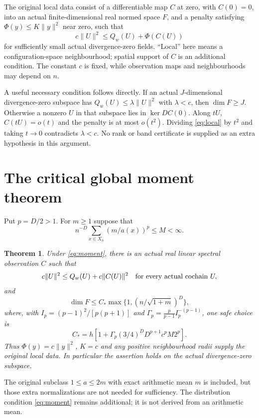 \documentclass[11pt]{article}
\newtheorem{theorem}{Theorem}
\begin{document}
The original local data consist of a differentiable map $C$ at zero, with $C(0)=0$,
into an actual finite-dimensional real normed space $F$, and a penalty satisfying
$\Phi(y)\leq K\|y\|^2$ near zero, such that
\begin{equation}\label{eq:local}
 c\|U\|^2\leq Q_w(U)+\Phi(C(U))
\end{equation}
for sufficiently small actual divergence-zero fields. ``Local'' here means a
configuration-space neighbourhood; spatial support of $C$ is an additional condition.
The constant $c$ is fixed, while observation maps and neighbourhoods may depend on $n$.

A useful necessary condition follows directly. If an actual $J$-dimensional
divergence-zero subspace has $Q_w(U)\leq\lambda\|U\|^2$ with $\lambda<c$, then
$\dim F\geq J$. Otherwise a nonzero $U$ in that subspace lies in $\ker DC(0)$.
Along $tU$, $C(tU)=o(t)$ and the penalty is at most $o(t^2)$. Dividing
\eqref{eq:local} by $t^2$ and taking $t\to0$ contradicts $\lambda<c$.
No rank or band certificate is supplied as an extra hypothesis in this argument.

\section{The critical global moment theorem}
Put $p=D/2>1$. For $m\geq1$ suppose that
\begin{equation}\label{eq:moment}
 n^{-D}\sum_{x\in X_n}(m/a(x))^p\leq M<\infty.
\end{equation}
\begin{theorem}\label{thm:critical}
Under \eqref{eq:moment}, there is an actual real linear spectral observation $C$ such that
\[
 c\|U\|^2\leq Q_w(U)+c\|C(U)\|^2
 \quad\hbox{for every actual cochain }U,
\]
and
\begin{equation}\label{eq:rank}
 \dim F\leq C_*\max\{1,(n/\sqrt{1+m})^D\},
\end{equation}
where, with $I_p=(p-1)^2/[p(p+1)]$ and
$\Gamma_p=\frac p{p-1}I_p^{-(p-1)}$, one safe choice is
\[
 C_*=h\left[1+\Gamma_p(3/4)^D D^{p+1}c^pM2^p\right].
\]
Thus $\Phi(y)=c\|y\|^2$, $K=c$ and any positive neighbourhood radii supply the original
local data. In particular the assertion holds on the actual divergence-zero subspace.
\end{theorem}
The original subclass $1\leq a\leq2m$ with exact arithmetic mean $m$ is included,
but those extra normalizations are not needed for sufficiency. The distribution
condition \eqref{eq:moment} remains additional; it is not derived from an arithmetic mean.
\end{document}
